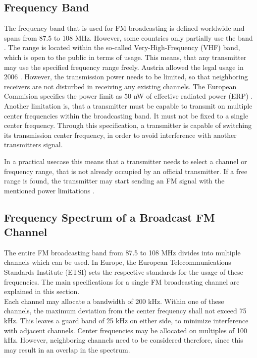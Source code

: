 \subsection{Frequency Band}

The frequency band that is used for FM broadcasting is defined worldwide and spans from 87.5 to 108 MHz.
However, some countries only partially use the band \cite[RR5-39]{ItuRadioRegulations}.
The range is located within the so-called Very-High-Frequency (VHF) band, which is open to the public in terms of usage.
This means, that any transmitter may use the specified frequency range freely.
Austria allowed the legal usage in 2006 \cite{AustriaRundfunkgesetz2014}.
However, the transmission power needs to be limited, so that neighboring receivers are not disturbed in receiving any existing channels.
The European Commision specifies the power limit as 50 nW of effective radiated power (ERP) \cite{EuCommissionRadioSpectrumHarmonization}.
Another limitation is, that a transmitter must be capable to transmit on multiple center frequencies within the broadcasting band.
It must not be fixed to a single center frequency.
Through this specification, a transmitter is capable of switching its transmission center frequency, in order to avoid interference with another transmitters signal.

In a practical usecase this means that a transmitter needs to select a channel or frequency range, that is not already occupied by an official transmitter.
If a free range is found, the transmitter may start sending an FM signal with the mentioned power limitations \cite{EbuFmRegulators}.



\subsection{Frequency Spectrum of a Broadcast FM Channel}

The entire FM broadcasting band from 87.5 to 108 MHz divides into multiple channels which can be used.
In Europe, the European Telecommunications Standards Institute (ETSI) sets the respective standards for the usage of these frequencies.
The main specifications for a single FM broadcasting channel are explained in this section.\\

Each channel may allocate a bandwidth of 200 kHz.
Within one of these channels, the maximum deviation from the center frequency shall not exceed 75 kHz.
This leaves a guard band of 25 kHz on either side, to minimize interference with adjacent channels.
Center frequencies may be allocated on multiples of 100 kHz.
However, neighboring channels need to be considered therefore, since this may result in an overlap in the spectrum.\\

